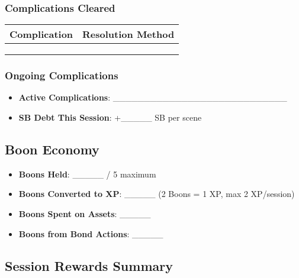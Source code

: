\subsubsection{Complications Cleared}
\begin{tabular}{|p{5cm}|p{5cm}|}
\hline
\textbf{Complication} & \textbf{Resolution Method} \\
\hline
& \\
& \\
& \\
\hline
\end{tabular}

\subsubsection{Ongoing Complications}
\begin{itemize}
    \item \textbf{Active Complications}: \_\_\_\_\_\_\_\_\_\_\_\_\_\_\_\_\_\_\_\_\_\_\_\_\_\_\_\_
    \item \textbf{SB Debt This Session}: +\_\_\_\_\_ SB per scene
\end{itemize}

\subsection{Boon Economy}

\begin{itemize}
    \item \textbf{Boons Held}: \_\_\_\_\_ / 5 maximum
    \item \textbf{Boons Converted to XP}: \_\_\_\_\_ (2 Boons = 1 XP, max 2 XP/session)
    \item \textbf{Boons Spent on Assets}: \_\_\_\_\_
    \item \textbf{Boons from Bond Actions}: \_\_\_\_\_
\end{itemize}

\subsection{Session Rewards Summary}

